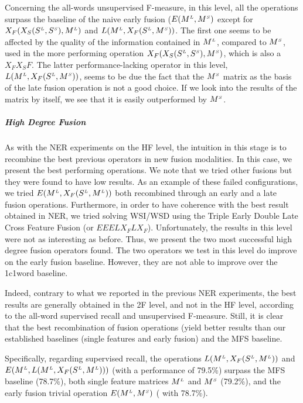 Concerning the all-words unsupervised F-measure, in this level, all the operations surpass the baseline of the naive early fusion ($E(M^{\scriptscriptstyle L},M^{\scriptscriptstyle S})$ except for  $X_F(X_S(S^{\scriptscriptstyle L},S^{\scriptscriptstyle S}),M^{\scriptscriptstyle L})$ and $L(M^{\scriptscriptstyle L}, X_F(S^{\scriptscriptstyle L},M^{\scriptscriptstyle S}))$. The first one seems to be affected by the quality of the information contained in $M^{\scriptscriptstyle L}$, compared to $M^{\scriptscriptstyle S}$, used in the more performing operation $X_F(X_S(S^{\scriptscriptstyle L}, S^{\scriptscriptstyle S}), M^{\scriptscriptstyle S})$, which is also a $X_FX_SF$.  The latter performance-lacking operator in this level, $L(M^{\scriptscriptstyle L}, X_F(S^{\scriptscriptstyle L},M^{\scriptscriptstyle S}))$, seems to be due the fact that the $M^{\scriptscriptstyle S}$ matrix as the basis of the late fusion operation is not a good choice. If we look into the results of the matrix by itself, we see that it is easily outperformed by $M^{\scriptscriptstyle S}$.




\subparagraph{High Degree Fusion}
As with the NER experiments on the HF level, the intuition in this stage is to recombine the best previous  operators in new fusion modalities. In this case, we present the best performing operations. We note that we tried other fusions but they were found to have low results. As an example of these failed configurations, we tried $E(M^{\scriptscriptstyle L},X_F(S^{\scriptscriptstyle L},M^{\scriptscriptstyle L}))$ both recombined through an early and a late fusion operations. Furthermore, in order to have coherence with the best result obtained in NER, we tried solving WSI/WSD using the Triple Early Double Late Cross Feature Fusion (or $EEELX_FLX_F$). Unfortunately, the results in this level were not as interesting as before. Thus, we present the two most successful high degree fusion operators found. The two operators we test in this level do improve on the early fusion baseline. However, they are not able to improve over the 1c1word baseline. 

Indeed, contrary to what we reported in the previous NER experiments, the best results are generally obtained in the 2F level, and not in the HF level, according to the all-word supervised recall and unsupervised F-measure. Still, it is clear that the best recombination of fusion operations (yield better results than our established baselines (single features and early fusion) and the MFS baseline.

Specifically, regarding supervised recall, the operations $L(M^{\scriptscriptstyle L}, X_F(S^{\scriptscriptstyle L},M^{\scriptscriptstyle L}))$ and $E(M^{\scriptscriptstyle L},L(M^{\scriptscriptstyle L},X_F(S^{\scriptscriptstyle L},M^{\scriptscriptstyle L})))$ (with a performance of 79.5\%) surpass the MFS baseline (78.7\%), both single feature matrices $M^{\scriptscriptstyle L}$ and $M^{\scriptscriptstyle S}$ (79.2\%), and the early fusion trivial operation $E(M^{\scriptscriptstyle L},M^{\scriptscriptstyle S})$ ( with 78.7\%).
  

